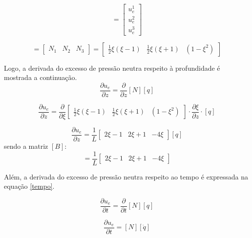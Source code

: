 \documentclass{article} %
\begin{document}
\begin{equation}
[q]=\begin{bmatrix}
u_e^1\\u_e^2\\u_e^3
\end{bmatrix}
\end{equation}

\begin{equation}
[N]=\begin{bmatrix}
N_1&N_2&N_3
\end{bmatrix}=\begin{bmatrix}
\frac{1}{2}\xi(\xi-1)&\frac{1}{2}\xi(\xi+1)&(1-\xi^2)
\end{bmatrix}
\end{equation}

Logo, a derivada do excesso de pressão neutra respeito à profundidade é mostrada a continuação.
\begin{equation*}
\frac{\partial u_e}{\partial z}=\frac{\partial}{\partial z}[N][q]
\end{equation*}

\begin{equation*}
\frac{\partial u_e}{\partial z}=\frac{\partial}{\partial \xi}\begin{bmatrix}
\frac{1}{2}\xi(\xi-1)&\frac{1}{2}\xi(\xi+1)&(1-\xi^2)
\end{bmatrix}\cdot \frac{\partial \xi}{\partial z}\cdot[q]
\end{equation*}

\begin{equation}
\frac{\partial u_e}{\partial z}=\frac{1}{L}\begin{bmatrix}
2\xi-1&2\xi+1&-4\xi
\end{bmatrix}[q]
\end{equation}
 sendo a matriz \([B]\):
\begin{equation}
[B]=\frac{1}{L}\begin{bmatrix}
2\xi-1&2\xi+1&-4\xi
\end{bmatrix}
\end{equation}

Além, a derivada do excesso de pressão neutra respeito ao tempo é expressada na equação \ref{tempo}.

\begin{equation*}
\frac{\partial u_e}{\partial t}=\frac{\partial}{\partial t}[N][q]
\end{equation*}


\begin{equation}\label{tempo}
\frac{\partial u_e}{\partial t}=[N][\dot{q}]
\end{equation}
\end{document}
